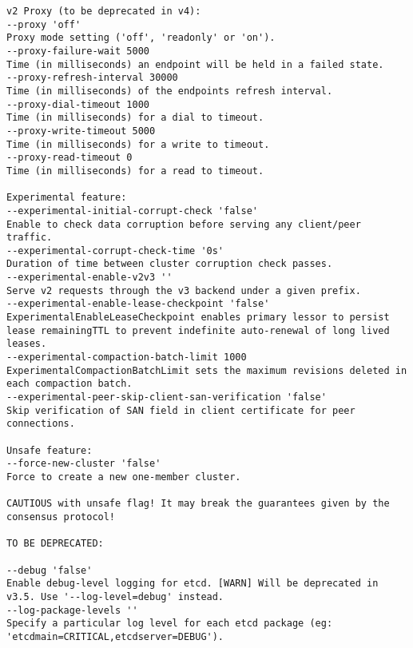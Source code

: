 \begin{verbatim}
v2 Proxy (to be deprecated in v4):
--proxy 'off'
Proxy mode setting ('off', 'readonly' or 'on').
--proxy-failure-wait 5000
Time (in milliseconds) an endpoint will be held in a failed state.
--proxy-refresh-interval 30000
Time (in milliseconds) of the endpoints refresh interval.
--proxy-dial-timeout 1000
Time (in milliseconds) for a dial to timeout.
--proxy-write-timeout 5000
Time (in milliseconds) for a write to timeout.
--proxy-read-timeout 0
Time (in milliseconds) for a read to timeout.

Experimental feature:
--experimental-initial-corrupt-check 'false'
Enable to check data corruption before serving any client/peer traffic.
--experimental-corrupt-check-time '0s'
Duration of time between cluster corruption check passes.
--experimental-enable-v2v3 ''
Serve v2 requests through the v3 backend under a given prefix.
--experimental-enable-lease-checkpoint 'false'
ExperimentalEnableLeaseCheckpoint enables primary lessor to persist lease remainingTTL to prevent indefinite auto-renewal of long lived leases.
--experimental-compaction-batch-limit 1000
ExperimentalCompactionBatchLimit sets the maximum revisions deleted in each compaction batch.
--experimental-peer-skip-client-san-verification 'false'
Skip verification of SAN field in client certificate for peer connections.

Unsafe feature:
--force-new-cluster 'false'
Force to create a new one-member cluster.

CAUTIOUS with unsafe flag! It may break the guarantees given by the consensus protocol!

TO BE DEPRECATED:

--debug 'false'
Enable debug-level logging for etcd. [WARN] Will be deprecated in v3.5. Use '--log-level=debug' instead.
--log-package-levels ''
Specify a particular log level for each etcd package (eg: 'etcdmain=CRITICAL,etcdserver=DEBUG').

\end{verbatim}


